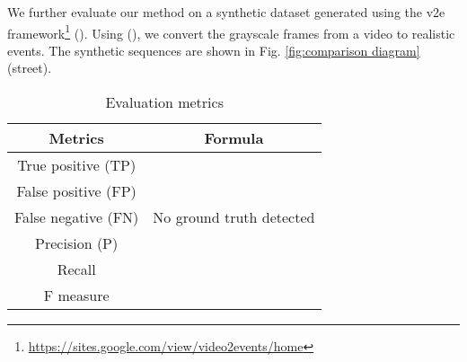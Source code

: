 \documentclass{article}
\begin{document}
We further evaluate our method on a synthetic dataset generated using the v2e framework\footnote{\url{https://sites.google.com/view/video2events/home}} (\cite{hu2021v2e}). Using (\cite{hu2021v2e}), we convert the grayscale frames from a video to realistic events. The synthetic sequences are shown in Fig. \ref{fig:comparison diagram} (street).


\begin{table}[]
\centering
\caption{Evaluation metrics}
\label{tab:metric}
\begin{tabular}{|c|c|}
\hline
\textbf{Metrics} & \textbf{Formula} \\ \hline
True positive (TP) &  \\ \hline
False positive (FP) &  \\ \hline
False negative (FN) & No ground truth detected \\ \hline
Precision (P) &  \\ \hline
Recall &  \\ \hline
F measure &  \\ \hline
\end{tabular}
\end{table}

\begin{table*}[]
\centering
\caption{Comparison of GSCEventMOD with the state-of-the-art methods. Note that the precision and recall scores are in percentage. The best results are in bold.}
\label{tab:metric table}
\end{table*}
\end{document}
